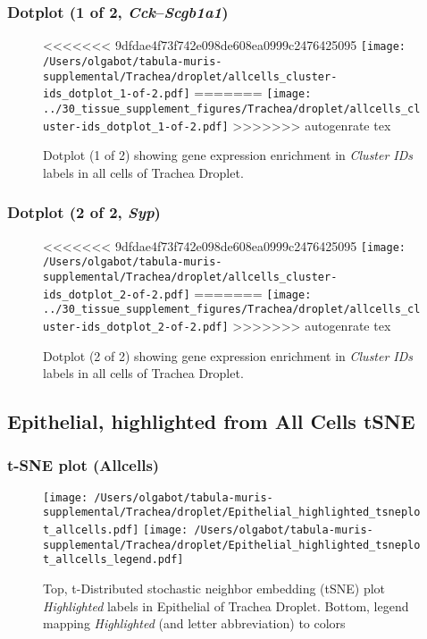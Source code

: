 \clearpage

\subsubsection{Dotplot (1 of 2, \emph{Cck}--\emph{Scgb1a1})}
\begin{figure}[h]
\centering
<<<<<<< 9dfdae4f73f742e098de608ea0999c2476425095
\texttt{[image: /Users/olgabot/tabula-muris-supplemental/Trachea/droplet/allcells\_cluster-ids\_dotplot\_1-of-2.pdf]}
=======
\texttt{[image: ../30\_tissue\_supplement\_figures/Trachea/droplet/allcells\_cluster-ids\_dotplot\_1-of-2.pdf]}
>>>>>>> autogenrate tex

\caption{ Dotplot (1 of 2)  showing gene expression enrichment in \emph{Cluster IDs} labels in all cells of Trachea Droplet. }
\end{figure}


\clearpage

\subsubsection{Dotplot (2 of 2, \emph{Syp})}
\begin{figure}[h]
\centering
<<<<<<< 9dfdae4f73f742e098de608ea0999c2476425095
\texttt{[image: /Users/olgabot/tabula-muris-supplemental/Trachea/droplet/allcells\_cluster-ids\_dotplot\_2-of-2.pdf]}
=======
\texttt{[image: ../30\_tissue\_supplement\_figures/Trachea/droplet/allcells\_cluster-ids\_dotplot\_2-of-2.pdf]}
>>>>>>> autogenrate tex

\caption{ Dotplot (2 of 2)  showing gene expression enrichment in \emph{Cluster IDs} labels in all cells of Trachea Droplet. }
\end{figure}


\clearpage
\subsection{Epithelial, highlighted from All Cells tSNE}
\subsubsection{t-SNE plot (Allcells)}
\begin{figure}[h]
\centering
\texttt{[image: /Users/olgabot/tabula-muris-supplemental/Trachea/droplet/Epithelial\_highlighted\_tsneplot\_allcells.pdf]}
\texttt{[image: /Users/olgabot/tabula-muris-supplemental/Trachea/droplet/Epithelial\_highlighted\_tsneplot\_allcells\_legend.pdf]}
\caption{Top, t-Distributed stochastic neighbor embedding (tSNE) plot  \emph{Highlighted} labels in Epithelial of Trachea Droplet. Bottom, legend mapping \emph{Highlighted} (and letter abbreviation) to colors}
\end{figure}


